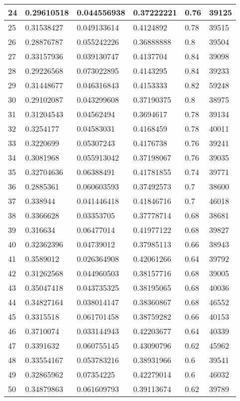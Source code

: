 \begin{longtable}{|l|l|l|l|l|l|}
24 & 0.29610518 & 0.044556938 & 0.37222221 & 0.76 & 39125 \\ \hline 
25 & 0.31538427 & 0.049133614 & 0.4124892 & 0.78 & 39515 \\ \hline 
26 & 0.28876787 & 0.055242226 & 0.36888888 & 0.8 & 39504 \\ \hline 
27 & 0.33157936 & 0.039130747 & 0.4137704 & 0.84 & 39098 \\ \hline 
28 & 0.29226568 & 0.073022895 & 0.4143295 & 0.84 & 39233 \\ \hline 
29 & 0.31448677 & 0.046316843 & 0.4153333 & 0.82 & 59248 \\ \hline 
30 & 0.29102087 & 0.043299608 & 0.37190375 & 0.8 & 38975 \\ \hline 
31 & 0.31204543 & 0.04562494 & 0.3694617 & 0.78 & 39134 \\ \hline 
32 & 0.3254177 & 0.04583031 & 0.4168459 & 0.78 & 40011 \\ \hline 
33 & 0.3220699 & 0.05307243 & 0.4176738 & 0.76 & 39241 \\ \hline 
34 & 0.3081968 & 0.055913042 & 0.37198067 & 0.76 & 39035 \\ \hline 
35 & 0.32704636 & 0.06388491 & 0.41781855 & 0.74 & 39771 \\ \hline 
36 & 0.2885361 & 0.060603593 & 0.37492573 & 0.7 & 38600 \\ \hline 
37 & 0.338944 & 0.041446418 & 0.41846716 & 0.7 & 46018 \\ \hline 
38 & 0.3366628 & 0.03353705 & 0.37778714 & 0.68 & 38681 \\ \hline 
39 & 0.316634 & 0.06477014 & 0.41977122 & 0.68 & 39827 \\ \hline 
40 & 0.32362396 & 0.04739012 & 0.37985113 & 0.66 & 38943 \\ \hline 
41 & 0.3589012 & 0.026364908 & 0.42061266 & 0.64 & 39792 \\ \hline 
42 & 0.31262568 & 0.044960503 & 0.38157716 & 0.68 & 39005 \\ \hline 
43 & 0.35047418 & 0.043735325 & 0.38195065 & 0.68 & 40036 \\ \hline 
44 & 0.34827164 & 0.038014147 & 0.38360867 & 0.68 & 46552 \\ \hline 
45 & 0.3315518 & 0.061701458 & 0.38759282 & 0.66 & 40153 \\ \hline 
46 & 0.3710074 & 0.033144943 & 0.42203677 & 0.64 & 40339 \\ \hline 
47 & 0.3391632 & 0.060755145 & 0.43090796 & 0.62 & 45962 \\ \hline 
48 & 0.33554167 & 0.053783216 & 0.38931966 & 0.6 & 39541 \\ \hline 
49 & 0.32865962 & 0.07354225 & 0.42279014 & 0.6 & 46032 \\ \hline 
50 & 0.34879863 & 0.061609793 & 0.39113674 & 0.62 & 39789 \\ \hline 
\end{longtable}